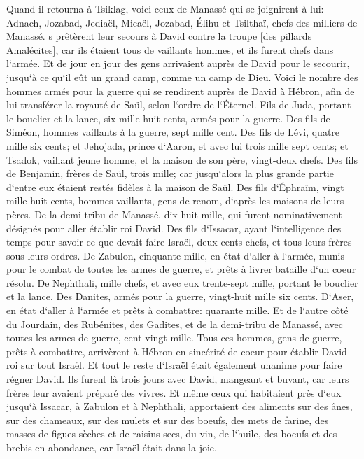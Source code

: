 \verse Quand il retourna à Tsiklag, voici ceux de Manassé qui se joignirent à lui: Adnach, Jozabad, Jediaël, Micaël, Jozabad, Élihu et Tsilthaï, chefs des milliers de Manassé. 
\verse s prêtèrent leur secours à David contre la troupe [des pillards Amalécites], car ils étaient tous de vaillants hommes, et ils furent chefs dans l`armée. 
\verse Et de jour en jour des gens arrivaient auprès de David pour le secourir, jusqu`à ce qu`il eût un grand camp, comme un camp de Dieu. 
\verse Voici le nombre des hommes armés pour la guerre qui se rendirent auprès de David à Hébron, afin de lui transférer la royauté de Saül, selon l`ordre de l`Éternel. 
\verse Fils de Juda, portant le bouclier et la lance, six mille huit cents, armés pour la guerre. 
\verse Des fils de Siméon, hommes vaillants à la guerre, sept mille cent. 
\verse Des fils de Lévi, quatre mille six cents; 
\verse et Jehojada, prince d`Aaron, et avec lui trois mille sept cents; 
\verse et Tsadok, vaillant jeune homme, et la maison de son père, vingt-deux chefs. 
\verse Des fils de Benjamin, frères de Saül, trois mille; car jusqu`alors la plus grande partie d`entre eux étaient restés fidèles à la maison de Saül. 
\verse Des fils d`Éphraïm, vingt mille huit cents, hommes vaillants, gens de renom, d`après les maisons de leurs pères. 
\verse De la demi-tribu de Manassé, dix-huit mille, qui furent nominativement désignés pour aller établir roi David. 
\verse Des fils d`Issacar, ayant l`intelligence des temps pour savoir ce que devait faire Israël, deux cents chefs, et tous leurs frères sous leurs ordres. 
\verse De Zabulon, cinquante mille, en état d`aller à l`armée, munis pour le combat de toutes les armes de guerre, et prêts à livrer bataille d`un coeur résolu. 
\verse De Nephthali, mille chefs, et avec eux trente-sept mille, portant le bouclier et la lance. 
\verse Des Danites, armés pour la guerre, vingt-huit mille six cents. 
\verse D`Aser, en état d`aller à l`armée et prêts à combattre: quarante mille. 
\verse Et de l`autre côté du Jourdain, des Rubénites, des Gadites, et de la demi-tribu de Manassé, avec toutes les armes de guerre, cent vingt mille. 
\verse Tous ces hommes, gens de guerre, prêts à combattre, arrivèrent à Hébron en sincérité de coeur pour établir David roi sur tout Israël. Et tout le reste d`Israël était également unanime pour faire régner David. 
\verse Ils furent là trois jours avec David, mangeant et buvant, car leurs frères leur avaient préparé des vivres. 
\verse Et même ceux qui habitaient près d`eux jusqu`à Issacar, à Zabulon et à Nephthali, apportaient des aliments sur des ânes, sur des chameaux, sur des mulets et sur des boeufs, des mets de farine, des masses de figues sèches et de raisins secs, du vin, de l`huile, des boeufs et des brebis en abondance, car Israël était dans la joie. 

